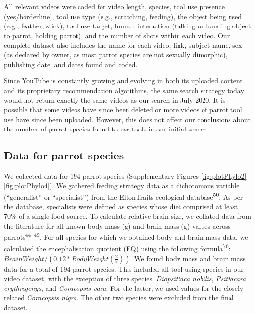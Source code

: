 \documentclass[
  man, donotrepeattitle,floatsintext]{apa6}
\begin{document}
All relevant videos were coded for video length, species, tool use presence
(yes/borderline), tool use type (e.g., scratching, feeding), the object being
used (e.g., feather, stick), tool use target, human interaction
(talking or handing object to parrot, holding parrot), and the number of shots
within each video. Our complete dataset also includes the name for each video,
link, subject name, sex (as declared by owner, as most parrot species are not
sexually dimorphic), publishing date, and dates found and coded.

Since YouTube is constantly growing and evolving in both its uploaded content
and its proprietary recommendation algorithms, the same search strategy today
would not return exactly the same videos as our search in July 2020. It is
possible that some videos have since been deleted or more videos of parrot tool
use have since been uploaded. However, this does not affect our conclusions
about the number of parrot species found to use tools in our initial search.

\hypertarget{data-for-parrot-species}{%
\subsection{Data for parrot species}\label{data-for-parrot-species}}

We collected data for 194 parrot species (Supplementary Figures
\ref{fig:plotPhylo2} - \ref{fig:plotPhylo4}). We gathered feeding strategy
data as a dichotomous variable (``generalist'' or ``specialist'') from the
EltonTraits ecological database\textsuperscript{50}. As per the database, specialists
were defined as species whose diet comprised at least 70\% of a single food
source. To calculate relative brain size, we collated data from the literature
for all known body mass (g) and brain mass (g) values across
parrots\textsuperscript{44--49}. For all species for which we obtained body and brain mass data, we
calculated the encephalisation quotient (EQ) using the following
formula\textsuperscript{76}: \(BrainWeight / (0.12 * BodyWeight(\frac{2}{3}))\). We
found body mass and brain mass data for a total of 194 parrot species. This
included all tool-using species in our video dataset, with the exception of
three species: \emph{Diopsittaca nobilis}, \emph{Psittacara erythrogenys}, and \emph{Coracopsis
vasa}. For the latter, we used values for the closely related \emph{Coracopsis
nigra}. The other two species were excluded from the final dataset.
\end{document}
